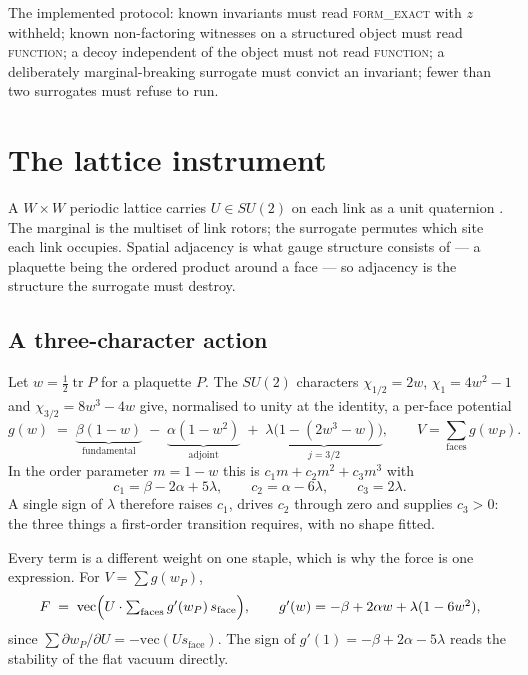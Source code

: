 \documentclass[11pt]{article}
\theoremstyle{remark}
\newcommand{\tier}[1]{\textsc{\MakeLowercase{#1}}}
\begin{document}
The implemented protocol: known invariants must read \tier{FORM\_EXACT} with $z$
withheld; known non-factoring witnesses on a structured object must read
\tier{FUNCTION}; a decoy independent of the object must not read \tier{FUNCTION}; a
deliberately marginal-breaking surrogate must convict an invariant; fewer than two
surrogates must refuse to run.

\section{The lattice instrument}\label{sec:lattice}

A $W\times W$ periodic lattice carries $U\in SU(2)$ on each link as a unit quaternion
\cite{wilson}. The marginal is the multiset of link rotors; the surrogate permutes which
site each link occupies. Spatial adjacency is what gauge structure consists of --- a
plaquette being the ordered product around a face --- so adjacency is the structure the
surrogate must destroy.

\subsection{A three-character action}

Let $w=\tfrac12\operatorname{tr}P$ for a plaquette $P$. The $SU(2)$ characters
$\chi_{1/2}=2w$, $\chi_1=4w^2-1$ and $\chi_{3/2}=8w^3-4w$ give, normalised to unity at
the identity, a per-face potential
\begin{equation}\label{eq:action}
  g(w)\;=\;\underbrace{\beta(1-w)}_{\text{fundamental}}
          \;-\;\underbrace{\alpha(1-w^2)}_{\text{adjoint}}
          \;+\;\underbrace{\lambda\bigl(1-(2w^3-w)\bigr)}_{j=3/2},
  \qquad V=\sum_{\text{faces}}g(w_P).
\end{equation}
In the order parameter $m=1-w$ this is $c_1m+c_2m^2+c_3m^3$ with
\begin{equation}\label{eq:cs}
  c_1=\beta-2\alpha+5\lambda,\qquad c_2=\alpha-6\lambda,\qquad c_3=2\lambda.
\end{equation}
A single sign of $\lambda$ therefore raises $c_1$, drives $c_2$ through zero and
supplies $c_3>0$: the three things a first-order transition requires, with no shape
fitted.

Every term is a different weight on one staple, which is why the force is one
expression. For $V=\sum g(w_P)$,
\begin{equation}\label{eq:force}
  F \;=\; \mathrm{vec}\Bigl(U\cdot\textstyle\sum_{\text{faces}}g'(w_P)\,s_{\text{face}}\Bigr),
  \qquad g'(w)=-\beta+2\alpha w+\lambda(1-6w^2),
\end{equation}
since $\sum\partial w_P/\partial U=-\mathrm{vec}(U s_{\text{face}})$. The sign of
$g'(1)=-\beta+2\alpha-5\lambda$ reads the stability of the flat vacuum directly.
\end{document}
